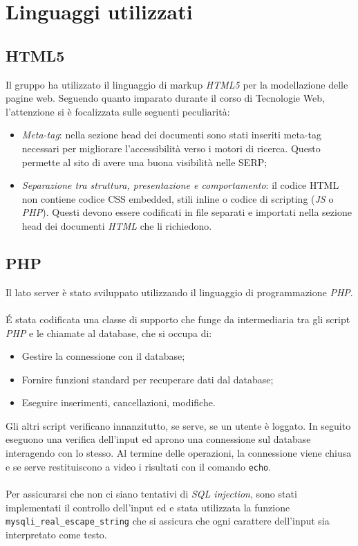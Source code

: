\section{Linguaggi utilizzati}

\subsection{HTML5}
Il gruppo ha utilizzato il linguaggio di markup \textit{HTML5} per la modellazione delle pagine web.
Seguendo quanto imparato durante il corso di Tecnologie Web, l'attenzione si è focalizzata sulle
seguenti peculiarità:
\begin{itemize}
	\item \textit{Meta-tag}: nella sezione head dei documenti sono stati inseriti meta-tag necessari per
	migliorare l'accessibilità verso i motori di ricerca. Questo permette al sito di avere una buona
	visibilità nelle SERP;
	\item \textit{Separazione tra struttura, presentazione e comportamento}: il codice HTML non contiene
	codice CSS embedded, stili inline o codice di scripting (\textit{JS} o \textit{PHP}). Questi devono
	essere codificati in file separati e importati nella sezione head dei documenti \textit{HTML} che
	li richiedono.
\end{itemize}

\subsection{PHP}
Il lato server è stato sviluppato utilizzando il linguaggio di programmazione \textit{PHP}.\\
\\
É stata codificata una classe di supporto che funge da intermediaria tra gli script \textit{PHP} e le
chiamate al database, che si occupa di:
\begin{itemize}
	\item Gestire la connessione con il database;
	\item Fornire funzioni standard per recuperare dati dal database;
	\item Eseguire inserimenti, cancellazioni, modifiche.
\end{itemize}
Gli altri script verificano innanzitutto, se serve, se un utente è loggato. In seguito eseguono una
verifica dell'input ed aprono una connessione sul database interagendo con lo stesso. Al termine delle
operazioni, la connessione viene chiusa e se serve restituiscono a video i risultati con il comando
\texttt{echo}.\\
\\
Per assicurarsi che non ci siano tentativi di \textit{SQL injection}, sono stati implementati il controllo dell'input ed e stata utilizzata la funzione \texttt{mysqli{\_}real{\_}escape{\_}string} che si assicura che ogni carattere dell'input sia interpretato come testo.

